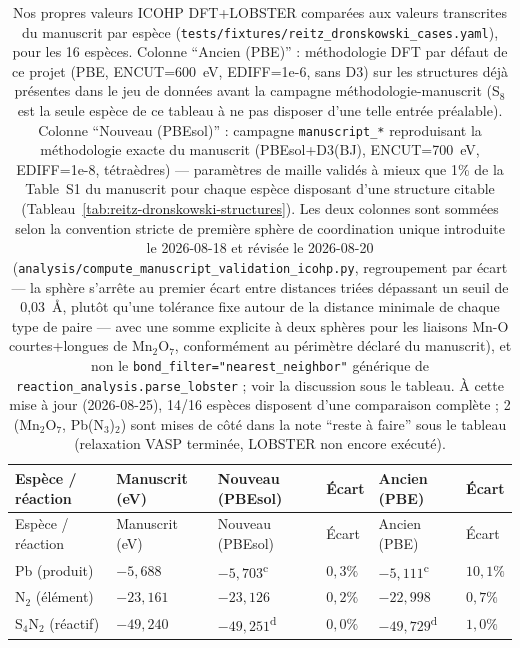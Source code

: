 {\small
\begin{longtable}{@{}p{2.4cm}*{5}{>{\raggedleft\arraybackslash}p{1.9cm}}@{}}
\caption{Nos propres valeurs ICOHP DFT+LOBSTER comparées aux valeurs transcrites du manuscrit par espèce (\texttt{tests/fixtures/reitz\_dronskowski\_cases.yaml}), pour les 16 espèces. Colonne ``Ancien (PBE)'' : méthodologie DFT par défaut de ce projet (PBE, ENCUT=600~eV, EDIFF=1e-6, sans D3) sur les structures déjà présentes dans le jeu de données avant la campagne méthodologie-manuscrit (S$_8$ est la seule espèce de ce tableau à ne pas disposer d'une telle entrée préalable). Colonne ``Nouveau (PBEsol)'' : campagne \texttt{manuscript\_*} reproduisant la méthodologie exacte du manuscrit (PBEsol+D3(BJ), ENCUT=700~eV, EDIFF=1e-8, tétraèdres) --- paramètres de maille validés à mieux que 1\% de la Table~S1 du manuscrit pour chaque espèce disposant d'une structure citable (Tableau~\ref{tab:reitz-dronskowski-structures}). Les deux colonnes sont sommées selon la convention stricte de première sphère de coordination unique introduite le 2026-08-18 et révisée le 2026-08-20 (\texttt{analysis/compute\_manuscript\_validation\_icohp.py}, regroupement par écart --- la sphère s'arrête au premier écart entre distances triées dépassant un seuil de 0,03~\AA, plutôt qu'une tolérance fixe autour de la distance minimale de chaque type de paire --- avec une somme explicite à deux sphères pour les liaisons Mn-O courtes+longues de Mn$_2$O$_7$, conformément au périmètre déclaré du manuscrit), et non le \texttt{bond\_filter="nearest\_neighbor"} générique de \texttt{reaction\_analysis.parse\_lobster} ; voir la discussion sous le tableau. À cette mise à jour (2026-08-25), 14/16 espèces disposent d'une comparaison complète ; 2 (Mn$_2$O$_7$, Pb(N$_3$)$_2$) sont mises de côté dans la note ``reste à faire'' sous le tableau (relaxation VASP terminée, LOBSTER non encore exécuté).}
\label{tab:reitz-dronskowski-dft}\\
\toprule
Espèce / réaction & Manuscrit (eV) & Nouveau (PBEsol) & Écart & Ancien (PBE) & Écart \\
\midrule
\endfirsthead
\toprule
Espèce / réaction & Manuscrit (eV) & Nouveau (PBEsol) & Écart & Ancien (PBE) & Écart \\
\midrule
\endhead
\bottomrule
\endfoot
Pb (produit) & $-5{,}688$ & $-5{,}703$\textsuperscript{c} & $0{,}3\%$ & $-5{,}111$\textsuperscript{c} & $10{,}1\%$ \\
N$_2$ (élément) & $-23{,}161$ & $-23{,}126$ & $0{,}2\%$ & $-22{,}998$ & $0{,}7\%$ \\
S$_4$N$_2$ (réactif) & $-49{,}240$ & $-49{,}251$\textsuperscript{d} & $0{,}0\%$ & $-49{,}729$\textsuperscript{d} & $1{,}0\%$ \\

\end{longtable}}
